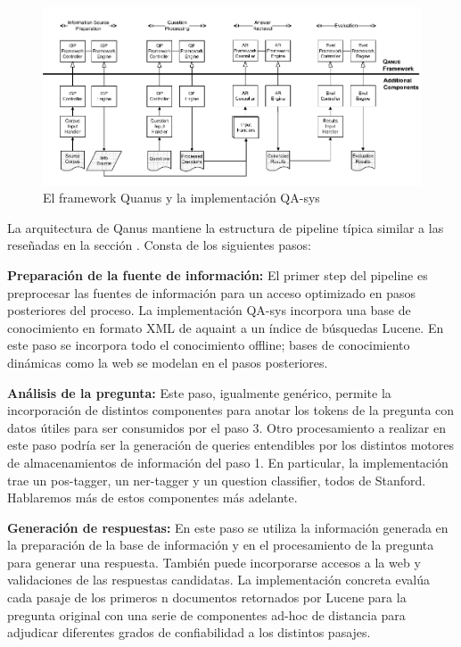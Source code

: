 \begin{figure}
  \centering
    \includegraphics{graficos/Quanus}
  \caption{El framework Quanus y la implementación QA-sys}
  \label{fig:Quanus}
\end{figure}


La arquitectura de Qanus mantiene la estructura de pipeline típica similar a las reseñadas en la sección .
Consta de los siguientes pasos: \newline

\textbf{Preparación de la fuente de información: } El primer step del pipeline es preprocesar las fuentes de información para un acceso optimizado en pasos posteriores del proceso. La implementación QA-sys incorpora una base de conocimiento en formato XML de aquaint a un índice de
búsquedas Lucene. En este paso se incorpora todo el conocimiento offline; bases de conocimiento dinámicas como la web se modelan en el pasos posteriores. \newline

\textbf{Análisis de la pregunta: } Este paso, igualmente genérico, permite la incorporación de
distintos componentes para anotar los tokens de la pregunta con datos
útiles para ser consumidos por el paso 3. Otro procesamiento a
realizar en este paso podría ser la generación de queries
entendibles por los distintos motores de almacenamientos de
información del paso 1. En particular, la implementación trae un
pos-tagger, un ner-tagger y un question classifier, todos de Stanford.
Hablaremos más de estos componentes más adelante. \newline

\textbf{Generación de respuestas: } En este paso se utiliza la información generada en la preparación
de la base de información y en el procesamiento de la pregunta para
generar una respuesta. También puede incorporarse accesos a la web y
validaciones de las respuestas candidatas. La implementación concreta
evalúa cada pasaje de los primeros n documentos retornados por Lucene
para la pregunta original con una serie de componentes ad-hoc de
distancia para adjudicar diferentes grados de confiabilidad a los
distintos pasajes. \newline


